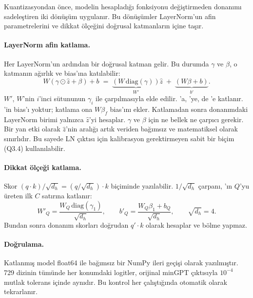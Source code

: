 Kuantizasyondan önce, modelin hesapladığı fonksiyonu değiştirmeden donanımı sadeleştiren iki dönüşüm uygulanır. Bu dönüşümler LayerNorm'un afin parametrelerini ve dikkat ölçeğini doğrusal katmanların içine taşır.

\paragraph{LayerNorm afin katlama.} Her LayerNorm'un ardından bir doğrusal katman gelir. Bu durumda $\gamma$ ve $\beta$, o katmanın ağırlık ve bias'ına katılabilir:
\begin{equation}
  W\left(\gamma \odot \hat z + \beta\right) + b \;=\; \underbrace{\left(W\, \mathrm{diag}(\gamma)\right)}_{W'} \hat z \;+\; \underbrace{\left(W \beta + b\right)}_{b'} .
\end{equation}
$W'$, $W$'nin $i$'inci sütununun $\gamma_i$ ile çarpılmasıyla elde edilir.  'a,  'ye,  de 'e katlanır. 'in bias'ı yoktur; katlama ona $W\beta_f$ bias'ını ekler. Katlamadan sonra donanımdaki LayerNorm birimi yalnızca $\hat z$'yi hesaplar. $\gamma$ ve $\beta$ için ne bellek ne çarpıcı gerekir. Bir yan etki olarak $\hat z$'nin aralığı artık veriden bağımsız ve matematiksel olarak sınırlıdır. Bu sayede LN çıktısı için kalibrasyon gerektirmeyen sabit bir biçim (Q3.4) kullanılabilir.

\paragraph{Dikkat ölçeği katlama.} Skor $(q\cdot k)/\sqrt{d_h} = (q/\sqrt{d_h})\cdot k$ biçiminde yazılabilir. $1/\sqrt{d_h}$ çarpanı, 'ın $Q$'yu üreten ilk $C$ satırına katlanır:
\begin{equation}
  W'_{Q} = \frac{W_Q\, \mathrm{diag}(\gamma_1)}{\sqrt{d_h}}, \qquad b'_{Q} = \frac{W_Q \beta_1 + b_Q}{\sqrt{d_h}}, \qquad \sqrt{d_h} = 4 .
\end{equation}
Bundan sonra donanım skorları doğrudan $q'\cdot k$ olarak hesaplar ve bölme yapmaz.

\paragraph{Doğrulama.} Katlanmış model float64 ile bağımsız bir NumPy ileri geçişi olarak yazılmıştır. 729 dizinin tümünde her konumdaki logitler, orijinal minGPT çıktısıyla $10^{-4}$ mutlak tolerans içinde aynıdır. Bu kontrol  her çalıştığında otomatik olarak tekrarlanır.

